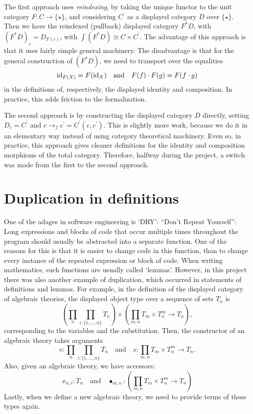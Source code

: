 The first approach uses \textit{reindexing}, by taking the unique functor to the unit category $ F : C \to \{ \star \} $, and considering $ C^\prime $ as a displayed category $ D $ over $ \{ \star \} $. Then we have the reindexed (pullback) displayed category $ F^* D $, with $ (F^* D)_c = D_{F(c)} $, with $ \int (F^* D) \cong C \times C^\prime $. The advantage of this approach is that it uses fairly simple general machinery. The disadvantage is that for the general construction of $ (F^* D) $, we need to transport over the equalities
\[ \text{id}_{F(X)} = F(\text{id}_{X}) \quad \text{and} \quad F(f) \cdot F(g) = F(f \cdot g) \]
in the definitions of, respectively, the displayed identity and composition. In practice, this adds friction to the formalization.

The second approach is by constructing the displayed category $ D $ directly, setting $ D_c = C^\prime $ and $ c \to_f c^\prime = C^\prime(c, c^\prime) $. This is slightly more work, because we do it in an elementary way instead of using category theoretical machinery. Even so, in practice, this approach gives cleaner definitions for the identity and composition morphisms of the total category. Therefore, halfway during the project, a switch was made from the first to the second approach.

\section{Duplication in definitions}
One of the adages in software engineering is `DRY': ``Don't Repeat Yourself'': Long expressions and blocks of code that occur multiple times throughout the program should usually be abstracted into a separate function. One of the reasons for this is that it is easier to change code in this function, than to change every instance of the repeated expression or block of code. When writing mathematics, such functions are usually called `lemmas'. However, in this project there was also another example of duplication, which occurred in statements of definitions and lemmas. For example, in the definition of the displayed category of algebraic theories, the displayed object type over a sequence of sets $ T_n $ is
\[ \left(\prod_n \prod_{i : \{ 1, \dots, n \}} T_n \right) \times \left( \prod_{m, n} T_m \times T_n^m \to T_n \right), \]
corresponding to the variables and the substitution. Then, the constructor of an algebraic theory takes arguments
\[ v : \prod_n \prod_{i : \{ 1, \dots, n \}} T_n \quad \text{and} \quad s : \prod_{m, n} T_m \times T_n^m \to T_n. \]
Also, given an algebraic theory, we have accessors:
\[ x_{n, i} : T_n \quad \text{and} \quad \bullet_{m, n} : (\prod_{m, n} T_m \times T_n^m \to T_n) \]
Lastly, when we define a new algebraic theory, we need to provide terms of these types again.

